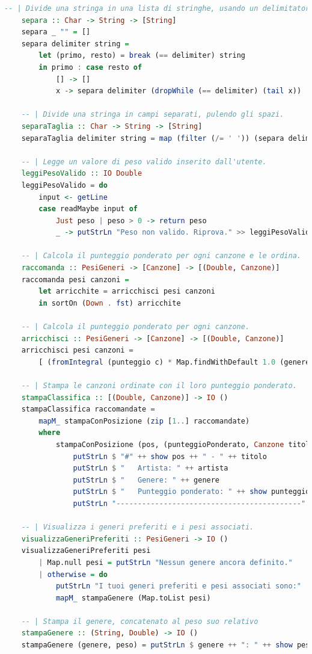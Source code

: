 \documentclass[a4paper,11pt]{article}
\begin{document}
\begin{lstlisting}[language=Haskell]
    -- | Divide una stringa in una lista di stringhe, usando un delimitatore.
    separa :: Char -> String -> [String]
    separa _ "" = []
    separa delimiter string =
        let (primo, resto) = break (== delimiter) string
        in primo : case resto of
            [] -> []
            x -> separa delimiter (dropWhile (== delimiter) (tail x))
    
    -- | Divide una stringa in campi separati, pulendo gli spazi.
    separaTaglia :: Char -> String -> [String]
    separaTaglia delimiter string = map (filter (/= ' ')) (separa delimiter string)
    
    -- | Legge un valore di peso valido inserito dall'utente.
    leggiPesoValido :: IO Double
    leggiPesoValido = do
        input <- getLine
        case readMaybe input of
            Just peso | peso > 0 -> return peso
            _ -> putStrLn "Peso non valido. Riprova." >> leggiPesoValido
    
    -- | Calcola il punteggio ponderato per ogni canzone e le ordina.
    raccomanda :: PesiGeneri -> [Canzone] -> [(Double, Canzone)]
    raccomanda pesi canzoni =
        let arricchite = arricchisci pesi canzoni
        in sortOn (Down . fst) arricchite
    
    -- | Calcola il punteggio ponderato per ogni canzone.
    arricchisci :: PesiGeneri -> [Canzone] -> [(Double, Canzone)]
    arricchisci pesi canzoni =
        [ (fromIntegral (punteggio c) * Map.findWithDefault 1.0 (genere c) pesi, c) | c <- canzoni ]
    
    -- | Stampa le canzoni ordinate con il loro punteggio ponderato.
    stampaClassifica :: [(Double, Canzone)] -> IO ()
    stampaClassifica raccomandate =
        mapM_ stampaConPosizione (zip [1..] raccomandate)
        where
            stampaConPosizione (pos, (punteggioPonderato, Canzone titolo artista genere _)) = do
                putStrLn $ "#" ++ show pos ++ " - " ++ titolo
                putStrLn $ "   Artista: " ++ artista
                putStrLn $ "   Genere: " ++ genere
                putStrLn $ "   Punteggio ponderato: " ++ show punteggioPonderato
                putStrLn "-------------------------------------------"
    
    -- | Visualizza i generi preferiti e i pesi associati.
    visualizzaGeneriPreferiti :: PesiGeneri -> IO ()
    visualizzaGeneriPreferiti pesi
        | Map.null pesi = putStrLn "Nessun genere ancora definito."
        | otherwise = do
            putStrLn "I tuoi generi preferiti e pesi associati sono:"
            mapM_ stampaGenere (Map.toList pesi)
    
    -- | Stampa il genere, concatenato al peso suo relativo
    stampaGenere :: (String, Double) -> IO ()
    stampaGenere (genere, peso) = putStrLn $ genere ++ ": " ++ show peso
\end{lstlisting}
\end{document}
